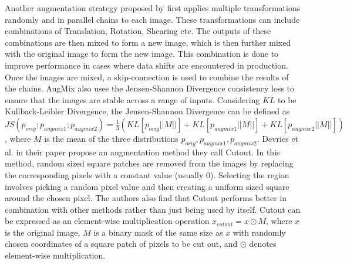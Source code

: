 Another augmentation strategy proposed by \cite{hendrycksAugMixSimpleData2020} first applies multiple transformations randomly and in parallel chains to each image. These transformations can include combinations of Translation, Rotation, Shearing etc. The outputs of these combinations are then mixed to form a new image, which is then further mixed with the original image to form the new image. This combination is done to improve performance in cases where data shifts are encountered in production. Once the images are mixed, a skip-connection is used to combine the results of the chains. AugMix also uses the Jensen-Shannon Divergence consistency loss \cite{linDivergenceMeasuresBased} to ensure that the images are stable across a range of inputs. Considering $KL$ to be Kullback-Leibler Divergence, the Jensen-Shannon Divergence can be defined as $
JS(p_{orig}; p_{augmix1};p_{augmix2}) = \frac{1}{3}(KL[p_{orig}||M||]+KL[p_{augmix1}||M||]+KL[p_{augmix2}||M||])
$, where $M$ is the mean of the three distributions $p_{orig}, p_{augmix1}, p_{augmix2}$.
Devries et al. in their paper \cite{devriesImprovedRegularizationConvolutional2017} propose an augmentation method they call Cutout. In this method, random sized square patches are removed from the images by replacing the corresponding pixels with a constant value (usually 0). Selecting the region involves picking a random pixel value and then creating a uniform sized square around the chosen pixel. The authors also find that Cutout performs better in combination with other methods rather than just being used by itself. Cutout can be expressed as an element-wise multiplication operation $x_{cutout} = x \odot M$,
where $x$ is the original image, $M$ is a binary mask of the same size as $x$ with randomly chosen coordinates of a square patch of pixels to be cut out, and $\odot$ denotes element-wise multiplication.


